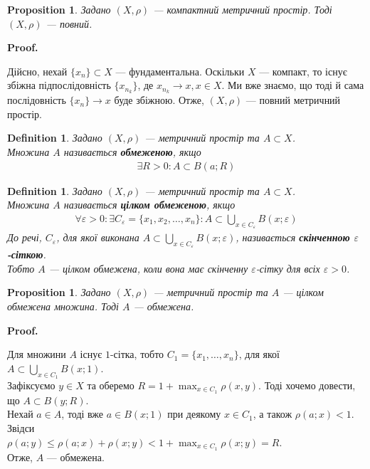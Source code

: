 \documentclass[a4paper, 10pt]{article}
\makeatletter
\theoremstyle{theoremdd}
\theoremstyle{theoremdd}
\newtheorem{definition}[theorem]{Definition}
\theoremstyle{theoremdd}
\theoremstyle{theoremdd}
\theoremstyle{theoremdd}
\newtheorem{proposition}[theorem]{Proposition}
\theoremstyle{theoremdd}
\theoremstyle{theoremdd}
\theoremstyle{theoremdd}
\renewenvironment{proof}[1][Proof.\\]{\par
\pushQED{\hfill \qed}%
\normalfont \topsep6\p@\@plus6\p@\relax
\trivlist
\item\relax
{\bfseries
#1\@addpunct{.}}\hspace\labelsep\ignorespaces
}{%
\popQED\endtrivlist\@endpefalse
}
\makeatother
\begin{document}
\begin{proposition}
Задано $(X,\rho)$ --- компактний метричний простір. Тоді $(X,\rho)$ --- повний.
\end{proposition}

\begin{proof}
Дійсно, нехай $\{x_n\} \subset X$ --- фундаментальна. Оскільки $X$ --- компакт, то існує збіжна підпослідовність $\{x_{n_k}\}$, де $x_{n_k} \to x, x \in X$. Ми вже знаємо, що тоді й сама послідовність $\{x_n\} \to x$ буде збіжною. Отже, $(X,\rho)$ --- повний метричний простір.
\end{proof}

\begin{definition}
Задано $(X,\rho)$ --- метричний простір та $A \subset X$.\\
Множина $A$ називається \textbf{обмеженою}, якщо
\begin{align*}
\exists R > 0: A \subset B(a;R)
\end{align*}
\end{definition}

\begin{definition}
Задано $(X,\rho)$ --- метричний простір та $A \subset X$.\\
Множина $A$ називається \textbf{цілком обмеженою}, якщо
\begin{align*}
\forall \varepsilon > 0: \exists C_\varepsilon = \{x_1,x_2,\dots,x_n\}: A \subset \displaystyle\bigcup_{x \in C_\varepsilon} B(x;\varepsilon)
\end{align*}
До речі, $C_\varepsilon$, для якої виконана $A \subset \displaystyle\bigcup_{x \in C_\varepsilon} B(x;\varepsilon)$, називається \textbf{скінченною $\varepsilon$-сіткою}.\\
Тобто $A$ --- цілком обмежена, коли вона має скінченну $\varepsilon$-сітку для всіх $\varepsilon > 0$.
\end{definition}

\begin{proposition}
Задано $(X,\rho)$ --- метричний простір та $A$ --- цілком обмежена множина. Тоді $A$ --- обмежена.
\end{proposition}

\begin{proof}
Для множини $A$ існує $1$-сітка, тобто $C_1 = \{x_1,\dots,x_n\}$, для якої $A \subset \displaystyle\bigcup_{x \in C_1} B(x;1)$.\\
Зафіксуємо $y \in X$ та оберемо $R = 1 +\displaystyle\max_{x \in C_1} \rho(x,y)$. Тоді хочемо довести, що $A \subset B(y;R)$.\\
Нехай $a \in A$, тоді вже $a \in B(x;1)$ при деякому $x \in C_1$, а також $\rho(a;x) < 1$. Звідси\\
$\rho(a;y) \leq \rho(a;x) + \rho(x;y) < 1 + \displaystyle\max_{x \in C_1} \rho(x;y) = R$.\\
Отже, $A$ --- обмежена.
\end{proof}
\end{document}
